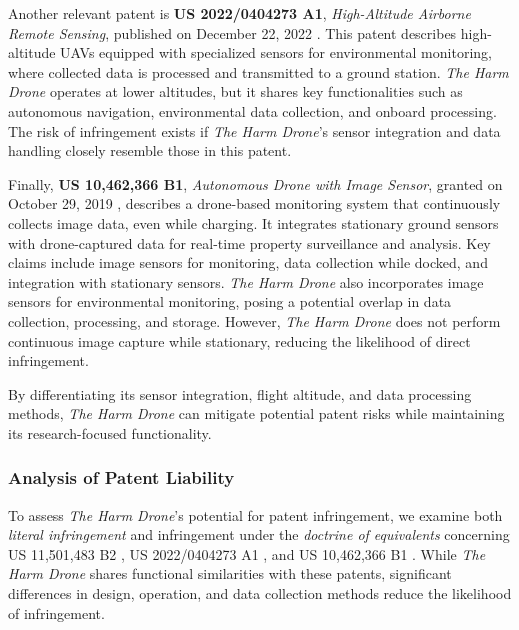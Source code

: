 \documentclass[12pt]{article}
\begin{document}
Another relevant patent is \textbf{US 2022/0404273 A1}, \textit{High-Altitude Airborne Remote Sensing}, published on December 22, 2022 \cite{patent2}. This patent describes high-altitude UAVs equipped with specialized sensors for environmental monitoring, where collected data is processed and transmitted to a ground station. \textit{The Harm Drone} operates at lower altitudes, but it shares key functionalities such as autonomous navigation, environmental data collection, and onboard processing. The risk of infringement exists if \textit{The Harm Drone}’s sensor integration and data handling closely resemble those in this patent.

Finally, \textbf{US 10,462,366 B1}, \textit{Autonomous Drone with Image Sensor}, granted on October 29, 2019 \cite{patent3}, describes a drone-based monitoring system that continuously collects image data, even while charging. It integrates stationary ground sensors with drone-captured data for real-time property surveillance and analysis. Key claims include image sensors for monitoring, data collection while docked, and integration with stationary sensors. \textit{The Harm Drone} also incorporates image sensors for environmental monitoring, posing a potential overlap in data collection, processing, and storage. However, \textit{The Harm Drone} does not perform continuous image capture while stationary, reducing the likelihood of direct infringement.

By differentiating its sensor integration, flight altitude, and data processing methods, \textit{The Harm Drone} can mitigate potential patent risks while maintaining its research-focused functionality.

\subsubsection{Analysis of Patent Liability}

To assess \textit{The Harm Drone}'s potential for patent infringement, we examine both \textit{literal infringement} and infringement under the \textit{doctrine of equivalents} concerning US 11,501,483 B2 \cite{patent1}, US 2022/0404273 A1 \cite{patent2}, and US 10,462,366 B1 \cite{patent3}. While \textit{The Harm Drone} shares functional similarities with these patents, significant differences in design, operation, and data collection methods reduce the likelihood of infringement.
\end{document}
